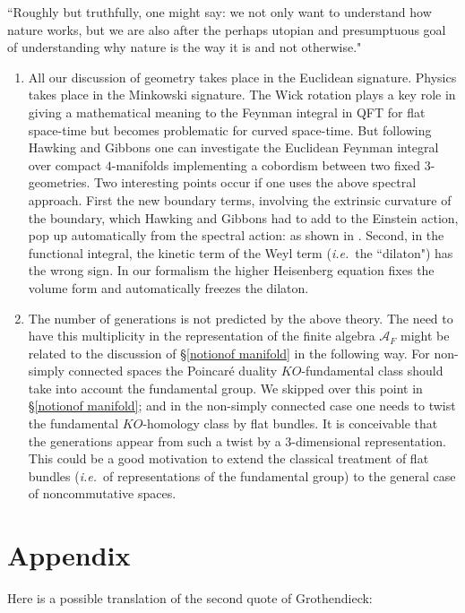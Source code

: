 \documentclass[12pt]{article}
\def\cA{{\mathcal A}}
\newcommand{\ie}{{\it i.e.\/}\ }
\begin{document}
``Roughly but truthfully, one might say: we not only want to understand how nature works, but we are also after the perhaps utopian and presumptuous goal of understanding why nature is the way it is and not otherwise."
\begin{enumerate}
\item All our discussion of geometry takes place in the Euclidean signature. Physics takes place in the Minkowski signature. The Wick rotation plays a key role in giving a mathematical meaning to the Feynman integral in QFT for flat space-time  but becomes problematic for curved space-time. But following Hawking and Gibbons one can investigate the Euclidean Feynman integral over compact $4$-manifolds implementing a cobordism between two fixed $3$-geometries. Two interesting points occur if one uses the above spectral approach. First the new boundary terms, involving the extrinsic curvature of the boundary, which Hawking and Gibbons had to add to the Einstein action, pop up automatically from the spectral action: as shown in \cite{cc7}. Second, in the functional integral, the kinetic term of the Weyl term (\ie the ``dilaton") has the wrong sign. In our formalism the higher Heisenberg equation fixes the volume form and automatically freezes the dilaton. 


\item The number of generations is not predicted by the above theory. The need to have this multiplicity in the representation of the finite algebra $\cA_F$ might  be related to the discussion of \S\ref{notionof manifold} in the following way. For non-simply connected spaces the Poincar\' e duality $KO$-fundamental class should take into account the fundamental group. We skipped over this point in \S\ref{notionof manifold}; and in the non-simply connected case one needs to twist the fundamental $KO$-homology class by flat bundles. It is conceivable that the generations appear from such a twist by a $3$-dimensional representation. This could be a good motivation to extend the classical treatment of flat bundles (\ie of representations of the fundamental group) to the general case of noncommutative spaces.

	
\end{enumerate}

\section{Appendix}\label{app1}

Here is a possible translation of the second quote of Grothendieck:
\end{document}
